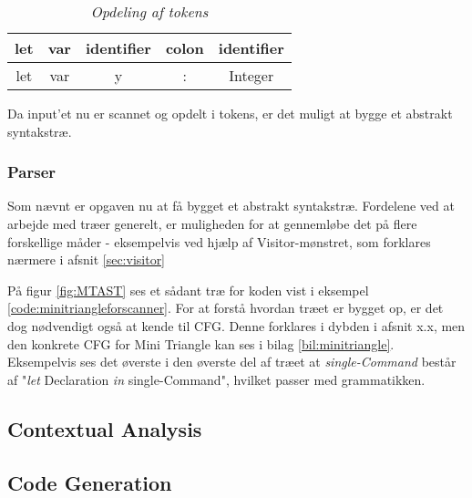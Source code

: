 \begin{table}[H]
\centering
    \begin{tabular}{|c|c|c|c|c|}
    \hline
    \textbf{let} & \textbf{var} & \textbf{identifier} & \textbf{colon} & \textbf{identifier} \\ \hline
    let          & var          & y                   & :              & Integer             \\ \hline
    \end{tabular}
\caption{\textit{Opdeling af tokens}}
\label{tab:tokensMT}
\end{table}

\noindent Da input'et nu er scannet og opdelt i tokens, er det muligt at bygge et abstrakt syntakstræ.

\subsubsection{Parser}
Som nævnt er opgaven nu at få bygget et abstrakt syntakstræ. Fordelene ved at arbejde med træer generelt, er muligheden for at gennemløbe det på flere forskellige måder - eksempelvis ved hjælp af Visitor-mønstret, som forklares nærmere i afsnit \ref{sec:visitor}


\noindent På figur \ref{fig:MTAST} ses et sådant træ for koden vist i eksempel \ref{code:minitriangleforscanner}. For at forstå hvordan træet er bygget op, er det dog nødvendigt også at kende til CFG. Denne forklares i dybden i afsnit x.x, men den konkrete CFG for Mini Triangle kan ses i bilag \ref{bil:minitriangle}. Eksempelvis ses det øverste i den øverste del af træet at \textit{single-Command} består af "\textit{let} Declaration \textit{in} single-Command"\mbox{}, hvilket passer med grammatikken.




\subsection{Contextual Analysis}

\subsection{Code Generation}